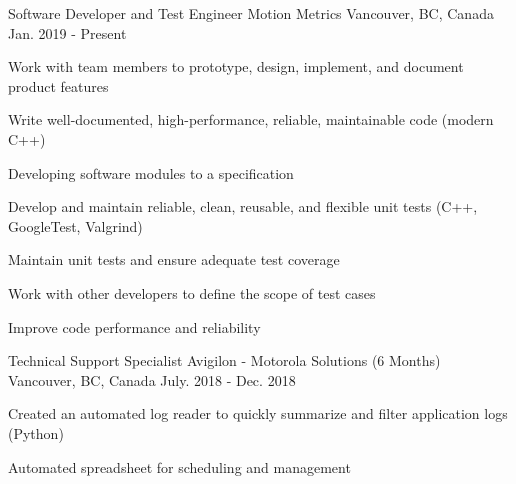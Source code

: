 

\begin{cventries}
\medskip

\cventry
    {Software Developer and Test Engineer} %
    {Motion Metrics} %
    {Vancouver, BC, Canada} %
    {Jan. 2019 - Present} %
    {
	  \begin{cvitems} %
		\item {Work with team members to prototype, design, implement, and document product features}
		\item {Write well-documented, high-performance, reliable, maintainable code (modern C++)}
		\item {Developing software modules to a specification}
		\item {Develop and maintain reliable, clean, reusable, and flexible unit tests (C++, GoogleTest, Valgrind)}
		\item {Maintain unit tests and ensure adequate test coverage}
		\item {Work with other developers to define the scope of test cases}
		\item {Improve code performance and reliability}
      \end{cvitems}
    }


\cventry
    {Technical Support Specialist} %
    {Avigilon - Motorola Solutions (6 Months)} %
    {Vancouver, BC, Canada} %
    {July. 2018 - Dec. 2018} %
    {
      \begin{cvitems} %
        \item {Created an automated log reader to quickly summarize and filter application logs (Python)}
        \item {Automated spreadsheet for scheduling and management}
      \end{cvitems}
    }



\end{cventries}
